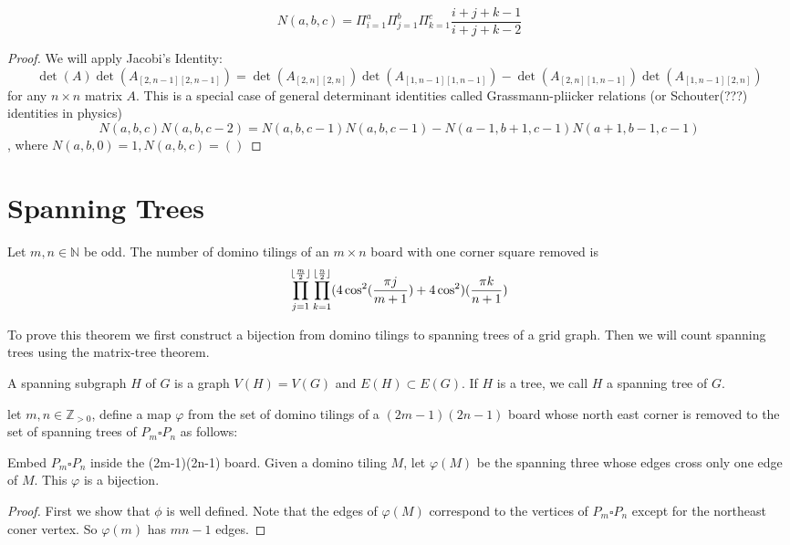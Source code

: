 \begin{theorem}
$$N(a,b,c) = \Pi_{i=1}^a\Pi_{j=1}^b\Pi_{k=1}^c \dfrac{i+j+k-1}{i+j+k-2}$$
\end{theorem}
\begin{proof}
We will apply Jacobi's Identity:
$$\det(A)\det(A_{[2,n-1][2,n-1]})=\det(A_{[2,n][2,n]})\det(A_{[1,n-1][1,n-1]}) - \det(A_{[2,n][1,n-1]})\det(A_{[1,n-1][2,n]})$$
for any $n\times n$ matrix $A$. This is a special case of general determinant identities called Grassmann-pliicker relations (or Schouter(???) identities in physics)
$$N(a,b,c)N(a,b,c-2) = N(a,b,c-1)N(a,b,c-1)-N(a-1,b+1,c-1)N(a+1,b-1,c-1)$$,
where $N(a,b,0)=1, N(a,b,c) = ()$
\end{proof}

\section{Spanning Trees}
\begin{theorem}
Let $m,n\in\mathbb{N}$ be odd. The number of domino tilings of an $m\times n$ board with one corner square removed is 
$$\prod_{j=1}^{\lfloor\frac{m}{2}\rfloor}\prod_{k=1}^{\lfloor\frac{n}{2}\rfloor}(4\cos^2(\frac{\pi j}{m+1})+4\cos^2)(\frac{\pi k}{n+1})$$
\end{theorem}
To prove this theorem we first construct a bijection from domino tilings to spanning trees of a grid graph. Then we will count spanning trees using the matrix-tree theorem.
\begin{definition}
A spanning subgraph $H$ of $G$ is a graph $V(H)=V(G)$ and $E(H)\subset E(G)$. If $H$ is a tree, we call $H$ a spanning tree of $G$.
\end{definition}
\begin{theorem}
let $m,n\in\mathbb{Z}_{>0}$, define a map $\varphi$ from the set of domino tilings of a $(2m-1)(2n-1)$ board whose north east corner is removed to the set of spanning trees of $P_m\square P_n$ as follows: 

Embed $P_m\square P_n$ inside the (2m-1)(2n-1) board. Given a domino tiling $M$, let $\varphi(M)$ be the spanning three whose edges cross only one edge of $M$. This $\varphi$ is a bijection.
\end{theorem}
\begin{proof}
First we show that $\phi$ is well defined. Note that the edges of $\varphi(M)$ correspond to the vertices of $P_m\square P_n$ except for the northeast coner vertex. So $\varphi(m)$ has $mn-1$ edges.
\end{proof}